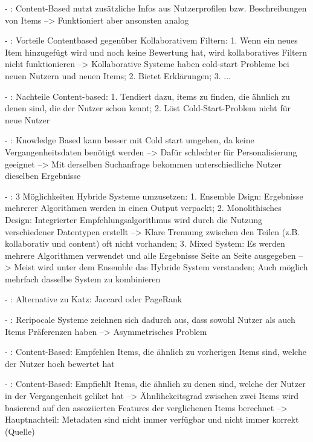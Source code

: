 - \cite{recommenderSystems:2016}: Content-Based nutzt zusätzliche Infos aus Nutzerprofilen bzw. Beschreibungen von Items --> Funktioniert aber ansonsten analog

- \cite[S. 161]{recommenderSystems:2016}: Vorteile Contentbased gegenüber Kollaborativem Filtern: 1. Wenn ein neues Item hinzugefügt wird und noch keine Bewertung hat, wird kollaboratives Filtern nicht funktionieren --> Kollaborative Systeme haben cold-start Probleme bei neuen Nutzern und neuen Items; 2. Bietet Erklärungen; 3. ...

- \cite[S. 161]{recommenderSystems:2016}: Nachteile Content-based: 1. Tendiert dazu, items zu finden, die ähnlich zu denen sind, die der Nutzer schon kennt; 2. Löst Cold-Start-Problem nicht für neue Nutzer

- \cite[S. 199]{recommenderSystems:2016}: Knowledge Based kann besser mit Cold start umgehen, da keine Vergangenheitsdaten benötigt werden --> Dafür schlechter für Personalisierung geeignet --> Mit derselben Suchanfrage bekommen unterschiedliche Nutzer dieselben Ergebnisse

- \cite[S. 199f.]{recommenderSystems:2016}: 3 Möglichkeiten Hybride Systeme umzusetzen: 1. Ensemble Dsign: Ergebnisse mehrerer Algorithmen werden in einen Output verpackt; 2. Monolithisches Design: Integrierter Empfehlungsalgorithmus wird durch die Nutzung verschiedener Datentypen erstellt --> Klare Trennung zwischen den Teilen (z.B. kollaborativ und content) oft nicht vorhanden; 3. Mixed System: Es werden mehrere Algorithmen verwendet und alle Ergebnisse Seite an Seite ausgegeben --> Meist wird unter dem Ensemble das Hybride System verstanden; Auch möglich mehrfach dasselbe System zu kombinieren

- \cite[S. 328]{recommenderSystems:2016}: Alternative zu Katz: Jaccard oder PageRank

- \cite[S. 443]{recommenderSystems:2016}: Reripocale Systeme zeichnen sich dadurch aus, dass sowohl Nutzer als auch Items Präferenzen haben --> Asymmetrisches Problem

- \cite[S. 2]{bharti:2019}: Content-Based: Empfehlen Items, die ähnlich zu vorherigen Items sind, welche der Nutzer hoch bewertet hat

- \cite[S. 1]{duong:2018}: Content-Based: Empfiehlt Items, die ähnlich zu denen sind, welche der Nutzer in der Vergangenheit geliket hat --> Ähnlihckeitsgrad zwischen zwei Items wird basierend auf den assoziierten Features der verglichenen Items berechnet --> Hauptnachteil: Metadaten sind nicht immer verfügbar und nicht immer korrekt (Quelle)

